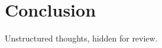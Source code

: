 \section{Conclusion}\label{conclusion}

Unstructured thoughts, hidden for review. 



%





%

%


